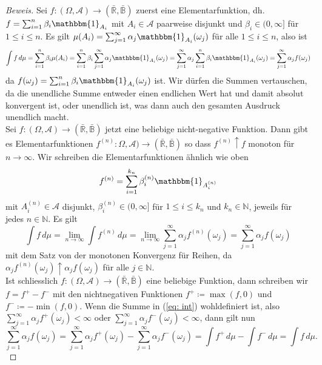 \documentclass[10pt]{article}
\begin{document}
\begin{proof}[Beweis]
Sei $f:(\Omega, \mathcal{A}) \rightarrow (\bar{\mathbb{R}}, \bar{\mathbb{B}})$ zuerst eine Elementarfunktion, dh. $f = \sum_{i=1}^n\beta_i \mathbbm{1}_{A_i}$ mit $A_i \in \mathcal{A}$ paarweise disjunkt und $\beta_i \in (0, \infty]$ für $1 \leq i \leq n$.
Es gilt $\mu(A_i) = \sum_{j=1}^\infty  \alpha_j \mathbbm{1}_{A_i}(\omega_j)$ für alle $1 \leq i \leq n$, also ist
$$
\int f \, d\mu = \sum_{i=1}^n \beta_i \mu(A_i) =  \sum_{i=1}^n \beta_i  \sum_{j=1}^\infty \alpha_j \mathbbm{1}_{A_i}(\omega_j) = \sum_{j=1}^\infty  \alpha_j  \sum_{i=1}^n \beta_i \mathbbm{1}_{A_i}(\omega_j) = \sum_{j=1}^\infty  \alpha_j  f(\omega_j)
$$
da $f(\omega_j) =   \sum_{i=1}^n \beta_i \mathbbm{1}_{A_i}(\omega_j)$ ist. Wir dürfen die Summen vertauschen, da die unendliche Summe entweder einen endlichen Wert hat und damit absolut konvergent ist, oder unendlich ist, was dann auch den gesamten Ausdruck unendlich macht. \\

Sei $f:(\Omega, \mathcal{A}) \rightarrow (\bar{\mathbb{R}}, \bar{\mathbb{B}})$ jetzt eine beliebige nicht-negative Funktion. 
Dann gibt es Elementarfunktionen $f^{(n)}:\Omega, \mathcal{A}) \rightarrow (\bar{\mathbb{R}}, \bar{\mathbb{B}})$ so dass $f^{(n)} \uparrow f$ monoton für $n \rightarrow \infty$.
Wir schreiben die Elementarfunktionen ähnlich wie oben
$$
f^{(n)} = \sum_{i=1}^{k_n} \beta^{(n)}_i \mathbbm{1}_{A^{(n)}_i}
$$
mit $A^{(n)}_i \in \mathcal{A}$ disjunkt, $ \beta^{(n)}_i \in (0,\infty]$ für $1 \leq i \leq k_n$ und $k_n \in \mathbb{N}$, jeweils für jedes $n \in \mathbb{N}$.
Es gilt
$$
\int f \, d\mu = \lim_{n \rightarrow \infty} \int f^{(n)} \, d\mu = \lim_{n \rightarrow \infty} \sum_{j=1}^\infty \alpha_j f^{(n)}(\omega_j) = \sum_{j=1}^\infty \alpha_j f(\omega_j) 
$$
mit dem Satz von der monotonen Konvergenz für Reihen, da $\alpha_j f^{(n)}(\omega_j) \uparrow \alpha_j f(\omega_j)$ für alle $j \in \mathbb{N}$. \\

Ist schliesslich $f:(\Omega, \mathcal{A}) \rightarrow (\bar{\mathbb{R}}, \bar{\mathbb{B}})$ eine beliebige Funktion, dann schreiben wir $f = f^+ - f^-$ mit den nichtnegativen Funktionen $f^+ \coloneqq \max(f,0)$ und $f^- \coloneqq -\min(f,0)$.
Wenn die Summe in (\ref{eq: int}) wohldefiniert ist, also $\sum_{j=1}^\infty \alpha_j f^+(\omega_j) < \infty$ oder $\sum_{j=1}^\infty \alpha_j f^-(\omega_j) < \infty$, dann gilt nun
$$
\sum_{j=1}^\infty \alpha_j f(\omega_j) = \sum_{j=1}^\infty \alpha_j f^+(\omega_j) - \sum_{j=1}^\infty \alpha_j f^-(\omega_j) = \int f^+ \, d\mu - \int f^- \, d\mu = \int f \, d\mu.
$$
\end{proof}
\end{document}
